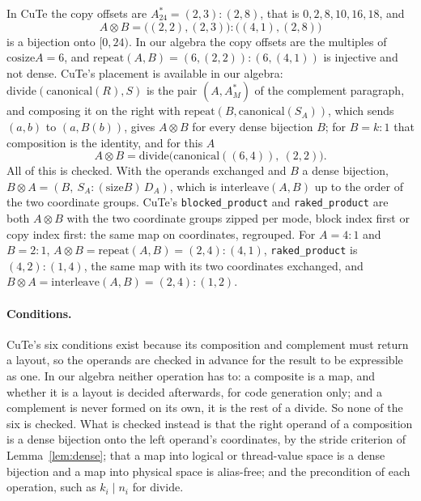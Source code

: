 \documentclass[11pt]{article}
\theoremstyle{definition}
\newcommand{\size}{\mathrm{size}}
\newcommand{\cosize}{\mathrm{cosize}}
\newcommand{\divideop}{\mathrm{divide}}
\newcommand{\repeatop}{\mathrm{repeat}}
\newcommand{\interleave}{\mathrm{interleave}}
\begin{document}
In CuTe the copy offsets are $A^{*}_{24} = (2,3){:}(2,8)$, that is
$0, 2, 8, 10, 16, 18$, and
\[
A \otimes B = \big((2,2),(2,3)\big){:}\big((4,1),(2,8)\big)
\]
is a bijection onto $[0,24)$. In our algebra the copy offsets are the multiples of
$\cosize A = 6$, and $\repeatop(A,B) = (6,(2,2)){:}(6,(4,1))$ is injective and
not dense. CuTe's placement is available in our algebra:
$\divideop(\mathrm{canonical}(R), S)$ is the pair $(A, A^{*}_{M})$ of the
complement paragraph, and composing it on the right with
$\repeatop(B, \mathrm{canonical}(S_A))$, which sends $(a,b)$ to $(a, B(b))$,
gives $A \otimes B$ for every dense bijection $B$; for $B = k{:}1$ that
composition is the identity, and for this $A$
\[
A \otimes B = \divideop\big(\mathrm{canonical}((6,4)),\ (2,2)\big).
\]
All of this is checked. With the
operands exchanged and $B$ a dense bijection, $B \otimes A = (B,\
S_A{:}(\size B)\,D_A)$, which is $\interleave(A,B)$ up to the order of the
two coordinate groups. CuTe's \texttt{blocked\_product} and
\texttt{raked\_product} are both $A \otimes B$ with the two coordinate groups
zipped per mode, block index first or copy index first: the same map on
coordinates, regrouped. For $A = 4{:}1$ and $B = 2{:}1$, $A \otimes B =
\repeatop(A,B) = (2,4){:}(4,1)$, \texttt{raked\_product} is $(4,2){:}(1,4)$,
the same map with its two coordinates exchanged, and $B \otimes A =
\interleave(A,B) = (2,4){:}(1,2)$.

\paragraph{Conditions.} CuTe's six conditions exist because its composition
and complement must return a layout, so the operands are checked in advance
for the result to be expressible as one. In our algebra neither operation has
to: a composite is a map, and whether it is a layout is decided afterwards,
for code generation only; and a complement is never formed on its own, it is
the rest of a $\divideop$. So none of the six is checked. What is checked
instead is that the right operand of a composition is a dense bijection onto
the left operand's coordinates, by the stride criterion of
Lemma~\ref{lem:dense}; that a map into logical or thread-value space is a
dense bijection and a map into physical space is alias-free; and the
precondition of each operation, such as $k_i \mid n_i$ for $\divideop$.
\end{document}
